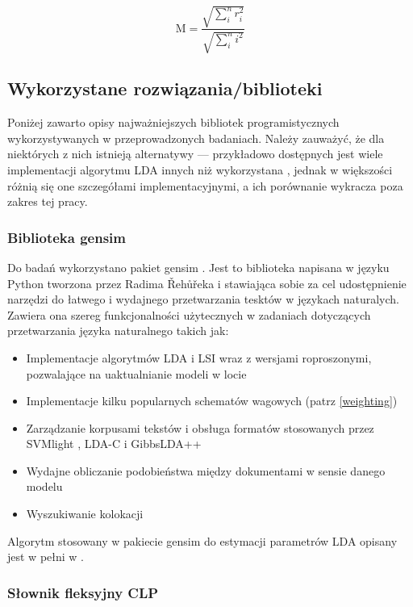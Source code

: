 \documentclass[11pt,a4paper]{article}
\begin{document}
\begin{equation}
  \label{eq:rating}
  \mathrm{M} = \frac{\sqrt{\sum_i^n r_i^2}}{\sqrt{\sum_i^n i^2}}
\end{equation}

\subsection{Wykorzystane rozwiązania/biblioteki}

Poniżej zawarto opisy najważniejszych bibliotek programistycznych
wykorzystywanych w przeprowadzonych badaniach. Należy zauważyć, że dla
niektórych z nich istnieją alternatywy --- przykładowo dostępnych jest wiele
implementacji algorytmu LDA innych niż wykorzystana
\cite{svmlight,lda-c,gibbs-lda}, jednak w większości różnią się one szczegółami
implementacyjnymi, a ich porównanie wykracza poza zakres tej pracy.

\subsubsection{Biblioteka gensim}
Do badań wykorzystano pakiet gensim \cite{gensim}. Jest to biblioteka napisana
w języku Python tworzona przez Radima Řehůřeka i stawiająca sobie za cel
udostępnienie narzędzi do łatwego i wydajnego przetwarzania tesktów w językach
naturalych. Zawiera ona szereg funkcjonalności użytecznych w zadaniach
dotyczących przetwarzania języka naturalnego takich jak:

\begin{itemize}
\item Implementacje algorytmów LDA i LSI wraz z wersjami roproszonymi, pozwalające na uaktualnianie modeli w locie
\item Implementacje kilku popularnych schematów wagowych (patrz \ref{weighting})
\item Zarządzanie korpusami tekstów i obsługa formatów stosowanych przez SVMlight \cite{svmlight},
LDA-C \cite{lda-c} i GibbsLDA++ \cite{gibbs-lda}
\item Wydajne obliczanie podobieństwa między dokumentami w sensie danego modelu
\item Wyszukiwanie kolokacji
\end{itemize}

Algorytm stosowany w pakiecie gensim do estymacji parametrów LDA opisany jest
w pełni w \cite{gensim-algorithm}.

\subsubsection{Słownik fleksyjny CLP}
\label{sec:clp}
\end{document}
